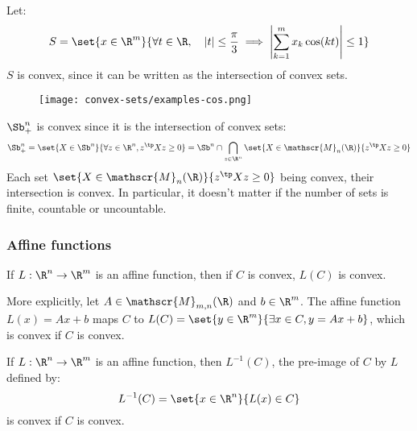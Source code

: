 \begin{example}
    Let:
    \begin{equation*}
        S = \set{x\in\R^m}{\forall t\in\R, \quad |t|\leq\frac{\pi}{3} \implies \left|\sum_{k=1}^m x_k\cos(kt)\right|\leq 1}
    \end{equation*}
    $S$ is convex, since it can be written as the intersection of convex sets.
    \begin{figure}[H]
        \centering
        \texttt{[image: convex-sets/examples-cos.png]}
    \end{figure}
\end{example}

\begin{example}
    $\Sb^n_+$ is convex since it is the intersection of convex sets:
    \begin{equation*}
        \Sb^n_+ = \set{X\in\Sb^n}{\forall z\in\R^n, z^\tp Xz\geq 0} = \Sb^n \cap \bigcap_{z\in\R^n} \set{X\in\mathscr{M}_n(\R)}{z^\tp Xz\geq 0}
    \end{equation*}
    Each set $\set{X\in\mathscr{M}_n(\R)}{z^\tp Xz\geq 0}$ being convex, their intersection is convex. In particular, it doesn't matter if the number of sets is finite, countable or uncountable.
\end{example}

\subsubsection{Affine functions}
\begin{property}
    If $L:\R^n\to\R^m$ is an affine function, then if $C$ is convex, $L(C)$ is convex.
\end{property}

More explicitly, let $A\in\mathscr{M}_{m,n}(\R)$ and $b\in\R^m$. The affine function $L(x) = Ax + b$ maps $C$ to $L(C) = \set{y\in\R^m}{\exists x\in C, y = Ax + b}$, which is convex if $C$ is convex.

\begin{property}
    If $L:\R^n\to\R^m$ is an affine function, then $L^{-1}(C)$, the pre-image of $C$ by $L$ defined by:
    \begin{equation*}
        L^{-1}(C) = \set{x\in\R^n}{L(x)\in C}
    \end{equation*}
    is convex if $C$ is convex.
\end{property}

